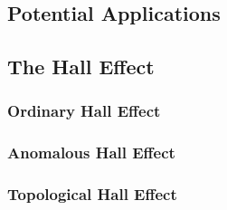 \subsection{Potential Applications}

\subsection{The Hall Effect}
\subsubsection{Ordinary Hall Effect}

\subsubsection{Anomalous Hall Effect}

\subsubsection{Topological Hall Effect}